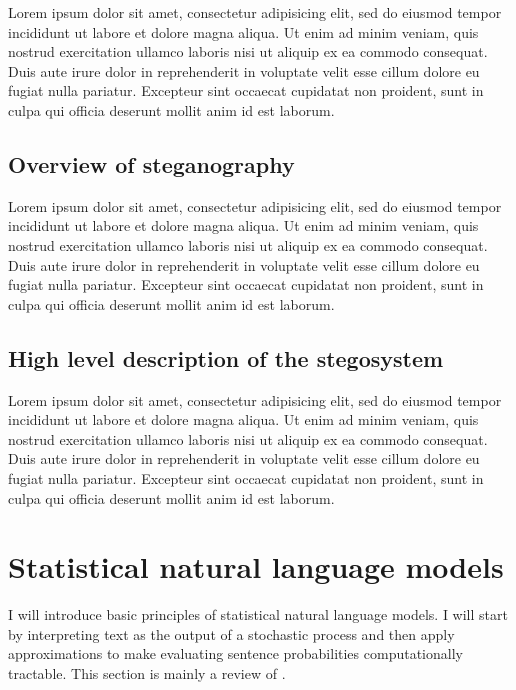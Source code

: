 \documentclass[draft]{IIBproject}
\begin{document}
Lorem ipsum dolor sit amet, consectetur adipisicing elit, sed do eiusmod tempor incididunt ut labore et dolore magna aliqua. Ut enim ad minim veniam, quis nostrud exercitation ullamco laboris nisi ut aliquip ex ea commodo consequat. Duis aute irure dolor in reprehenderit in voluptate velit esse cillum dolore eu fugiat nulla pariatur. Excepteur sint occaecat cupidatat non proident, sunt in culpa qui officia deserunt mollit anim id est laborum.

\FloatBarrier
\subsection{Overview of steganography}

Lorem ipsum dolor sit amet, consectetur adipisicing elit, sed do eiusmod tempor incididunt ut labore et dolore magna aliqua. Ut enim ad minim veniam, quis nostrud exercitation ullamco laboris nisi ut aliquip ex ea commodo consequat. Duis aute irure dolor in reprehenderit in voluptate velit esse cillum dolore eu fugiat nulla pariatur. Excepteur sint occaecat cupidatat non proident, sunt in culpa qui officia deserunt mollit anim id est laborum.

\FloatBarrier
\subsection{High level description of the stegosystem}

Lorem ipsum dolor sit amet, consectetur adipisicing elit, sed do eiusmod tempor incididunt ut labore et dolore magna aliqua. Ut enim ad minim veniam, quis nostrud exercitation ullamco laboris nisi ut aliquip ex ea commodo consequat. Duis aute irure dolor in reprehenderit in voluptate velit esse cillum dolore eu fugiat nulla pariatur. Excepteur sint occaecat cupidatat non proident, sunt in culpa qui officia deserunt mollit anim id est laborum.

\clearpage
\section{Statistical natural language models}
\label{sec:snlm}

I will introduce basic principles of statistical natural language models. I will start by interpreting text as the output of a stochastic process and then apply approximations to make evaluating sentence probabilities computationally tractable. This section is mainly a review of \cite{4f11:statistical_language_models, 4f11:smt_systems, coursera:nlp}.
\end{document}
